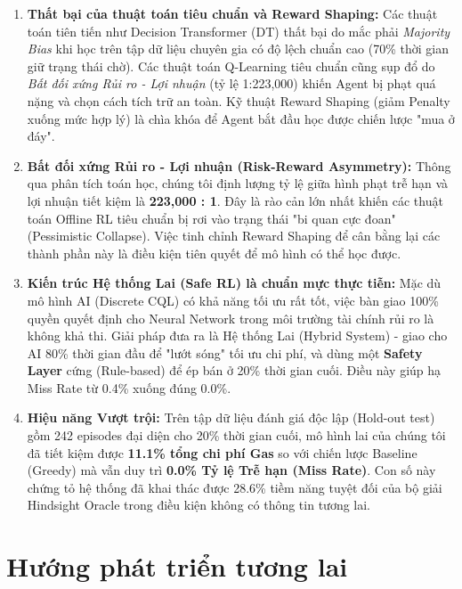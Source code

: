 \begin{enumerate}
    \item \textbf{Thất bại của thuật toán tiêu chuẩn và Reward Shaping:} Các thuật toán tiên tiến như Decision Transformer (DT) \cite{chen2021decision} thất bại do mắc phải \textit{Majority Bias} khi học trên tập dữ liệu chuyên gia có độ lệch chuẩn cao (70\% thời gian giữ trạng thái chờ). Các thuật toán Q-Learning tiêu chuẩn cũng sụp đổ do \textit{Bất đối xứng Rủi ro - Lợi nhuận} (tỷ lệ 1:223,000) khiến Agent bị phạt quá nặng và chọn cách tích trữ an toàn. Kỹ thuật Reward Shaping \cite{ng1999policy} (giảm Penalty xuống mức hợp lý) là chìa khóa để Agent bắt đầu học được chiến lược "mua ở đáy".
    
    \item \textbf{Bất đối xứng Rủi ro - Lợi nhuận (Risk-Reward Asymmetry):} Thông qua phân tích toán học, chúng tôi định lượng tỷ lệ giữa hình phạt trễ hạn và lợi nhuận tiết kiệm là \textbf{223,000 : 1}. Đây là rào cản lớn nhất khiến các thuật toán Offline RL tiêu chuẩn bị rơi vào trạng thái "bi quan cực đoan" (Pessimistic Collapse). Việc tinh chỉnh Reward Shaping để cân bằng lại các thành phần này là điều kiện tiên quyết để mô hình có thể học được.
    
    \item \textbf{Kiến trúc Hệ thống Lai (Safe RL) là chuẩn mực thực tiễn:} Mặc dù mô hình AI (Discrete CQL) có khả năng tối ưu rất tốt, việc bàn giao 100\% quyền quyết định cho Neural Network trong môi trường tài chính rủi ro là không khả thi. Giải pháp đưa ra là Hệ thống Lai (Hybrid System) - giao cho AI 80\% thời gian đầu để "lướt sóng" tối ưu chi phí, và dùng một \textbf{Safety Layer} cứng (Rule-based) để ép bán ở 20\% thời gian cuối. Điều này giúp hạ Miss Rate từ 0.4\% xuống đúng 0.0\%.
    
    \item \textbf{Hiệu năng Vượt trội:} Trên tập dữ liệu đánh giá độc lập (Hold-out test) gồm 242 episodes đại diện cho 20\% thời gian cuối, mô hình lai của chúng tôi đã tiết kiệm được \textbf{11.1\% tổng chi phí Gas} so với chiến lược Baseline (Greedy) mà vẫn duy trì \textbf{0.0\% Tỷ lệ Trễ hạn (Miss Rate)}. Con số này chứng tỏ hệ thống đã khai thác được 28.6\% tiềm năng tuyệt đối của bộ giải Hindsight Oracle trong điều kiện không có thông tin tương lai.
\end{enumerate}

\section*{Hướng phát triển tương lai}

